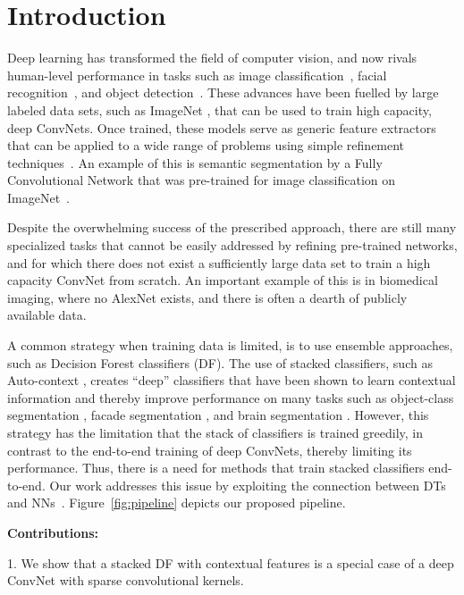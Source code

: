 \documentclass[twocolumn]{svjour3}
\begin{document}
\section{Introduction}
\label{intro}

Deep learning has transformed the field of computer vision, and now rivals human-level performance in tasks such as image classification~\cite{krizhevsky_cnn_2012, He:2015dj, Russakovsky:2015hb}, facial recognition~\cite{Taigman:2014gy}, and object detection~\cite{GirshickDDM14, Girshick:2015vr, Ren:2015ug}. These advances have been fuelled by large labeled data sets, such as ImageNet \cite{Russakovsky:2015hb}, that can be used to train high capacity, deep ConvNets. Once trained, these models serve as generic feature extractors that can be applied to a wide range of problems using simple refinement techniques~\cite{GirshickDDM14}. An example of this is semantic segmentation by a Fully Convolutional Network that was pre-trained for image classification on ImageNet~\cite{long_shelhamer_fcn_2015}.

Despite the overwhelming success of the prescribed approach, there are still many specialized tasks that cannot be easily addressed by refining pre-trained networks, and for which there does not exist a sufficiently large data set to train a high capacity ConvNet from scratch. An important example of this is in biomedical imaging, where no AlexNet exists, and there is often a dearth of publicly available data.

A common strategy when training data is limited, is to use ensemble approaches, such as Decision Forest classifiers (DF).  The use of stacked classifiers, such as Auto-context \cite{Tu2010}, creates ``deep'' classifiers that have been shown to learn contextual information and thereby improve performance on many tasks such as object-class segmentation \cite{ShottonJC08}, facade segmentation \cite{jampani}, and brain segmentation \cite{Tu2010}. However, this strategy has the limitation that the stack of classifiers is trained greedily, in contrast to the end-to-end training of deep ConvNets, thereby limiting its performance. Thus, there is a need for methods that train stacked classifiers end-to-end. 
Our work addresses this issue by exploiting the connection between DTs and NNs~\cite{Sethi1990}.
Figure~\ref{fig:pipeline} depicts our proposed pipeline.

\textbf{Contributions:}
 
1.         We show that a stacked DF with contextual features is a special case of a deep ConvNet with sparse convolutional kernels. 
\end{document}
